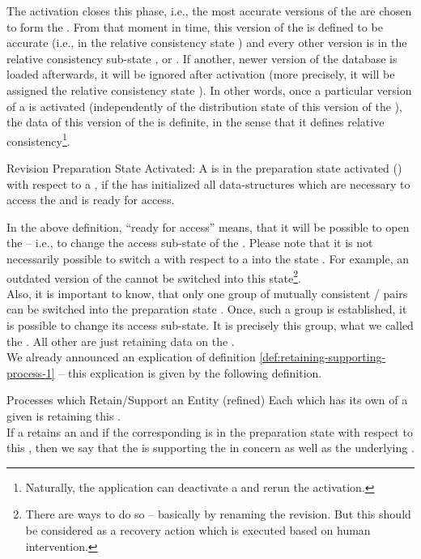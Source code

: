 \documentclass[a4paper, 12pt]{book}
\begin{document}
%
The activation closes this phase, i.e., the most accurate versions of
the  are chosen to form the . From that
moment in time, this version of the  is defined to be
accurate (i.e., in the relative consistency state
\revrelconstateACCURATE) and every other version is in the relative
consistency sub-state \revrelconstateOUTDATED, \revrelconstateBRANCHED
or \revrelconstateUNDEFINED.
%
If another, newer version of the database is loaded
afterwards, it will be ignored after activation (more precisely, it
will be assigned the relative consistency state
\revrelconstateBRANCHED). In other words, once a particular version of
a  is activated (independently of the distribution state
of this version of the ), the data of this version of the
 is definite, in the sense that it defines relative
consistency\footnote{Naturally, the application can deactivate a
 and rerun the activation.}.
%
\begin{definition*}{Revision Preparation State Activated: \revprepstateACTIVATED}
  A  is in the preparation state activated
  (\revprepstateACTIVATED) with respect to a , if the
   has initialized all data-structures which are necessary to
  access the  and is ready for access.
\end{definition*}
%
In the above definition, ``ready for access'' means, that it will be
possible to open the  -- i.e., to change the access
sub-state of the . 
%
Please note that it is not necessarily possible to switch a
 with respect to a  into the state
\revprepstateACTIVATED. For example, an outdated version of the
 cannot be switched into this state\footnote{There are
ways to do so -- basically by renaming the revision. But this should
be considered as a recovery action which is executed based on human
intervention.}.\\
%
Also, it is important to know, that only one group of mutually
consistent / pairs can be switched into the
preparation state \revprepstateACTIVATED. Once, such a group is
established, it is possible to change its access sub-state. It is
precisely this group, what we called the . All other  are just retaining data on the .\\
%
We already announced an explication of definition
\vref{def:retaining-supporting-process-1} -- this explication is given
by the following definition.
%
\begin{definition*}{Processes which Retain/Support an Entity (refined)}
  \label{def:retaining-supporting-process-2}
  Each  which has its own  of a given
   is retaining this .\\
  If a  retains an  and if the corresponding
   is in the preparation state \revprepstateACTIVATED
  with respect to this , then we say that the 
  is supporting the  in concern as well as the underlying .
\end{definition*}
\end{document}
